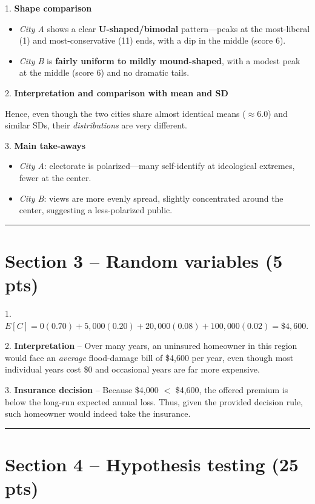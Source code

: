 \documentclass{article}
\begin{document}
1. \textbf{Shape comparison}
   \begin{itemize}
     \item \textit{City A} shows a clear \textbf{U-shaped/bimodal} pattern—peaks at the most-liberal (1) and most-conservative (11) ends, with a dip in the middle (score 6).
     \item \textit{City B} is \textbf{fairly uniform to mildly mound-shaped}, with a modest peak at the middle (score 6) and no dramatic tails.
   \end{itemize}

2. \textbf{Interpretation and comparison with mean and SD}

   Hence, even though the two cities share almost identical means ($\approx 6.0$) and similar SDs, their \textit{distributions} are very different.

3. \textbf{Main take-aways}
   \begin{itemize}
     \item \textit{City A}: electorate is polarized—many self-identify at ideological extremes, fewer at the center.
     \item \textit{City B}: views are more evenly spread, slightly concentrated around the center, suggesting a less-polarized public.
   \end{itemize}

\vspace{1em} %
\hrule %

\section*{Section 3 – Random variables (5 pts)}

1. $E[C]=0(0.70)+5{,}000(0.20)+20{,}000(0.08)+100{,}000(0.02)=\$4{,}600$.

2. \textbf{Interpretation} – Over many years, an uninsured homeowner in this region would face an \textit{average} flood-damage bill of \$4,600 per year, even though most individual years cost \$0 and occasional years are far more expensive.

3. \textbf{Insurance decision} – Because \$4,000 $<$ \$4,600, the offered premium is below the long-run expected annual loss. Thus, given the provided decision rule, such homeowner would indeed take the insurance.

\vspace{1em} %
\hrule %

\section*{Section 4 – Hypothesis testing (25 pts)}
\end{document}
